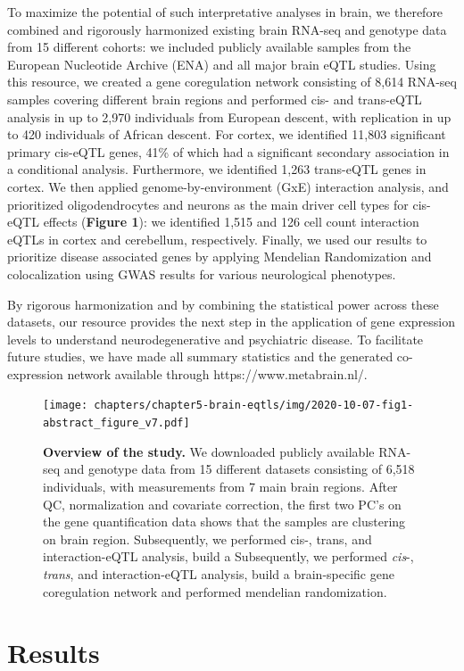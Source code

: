 {{To maximize the potential of such interpretative analyses in brain, we therefore combined and rigorously harmonized existing brain RNA-seq and genotype data from 15 different cohorts: we included publicly available samples from the European Nucleotide Archive (ENA) and all major brain eQTL studies. Using this resource, we created a gene coregulation network consisting of 8,614 RNA-seq samples covering different brain regions and performed cis- and trans-eQTL analysis in up to 2,970 individuals from European descent, with replication in up to 420 individuals of African descent. For cortex, we identified 11,803 significant primary cis-eQTL genes, 41\% of which had a significant secondary association in a conditional analysis. Furthermore, we identified 1,263 trans-eQTL genes in cortex. We then applied genome-by-environment (GxE) interaction analysis, and prioritized oligodendrocytes and neurons as the main driver cell types for cis-eQTL effects (\textbf{Figure 1}): we identified 1,515 and 126 cell count interaction eQTLs in cortex and cerebellum, respectively. Finally, we used our results to prioritize disease associated genes by applying Mendelian Randomization and colocalization using GWAS results for various neurological phenotypes.  

By rigorous harmonization and by combining the statistical power across these datasets, our resource provides the next step in the application of gene expression levels to understand neurodegenerative and psychiatric disease. To facilitate future studies, we have made all summary statistics and the generated co-expression network available through https://www.metabrain.nl/. 

\begin{figure}[h!]
	\texttt{[image: chapters/chapter5-brain-eqtls/img/2020-10-07-fig1-abstract\_figure\_v7.pdf]}
	\caption{\textbf{Overview of the study.} We downloaded publicly available RNA-seq and genotype data from 15 different datasets consisting of 6,518 individuals, with measurements from 7 main brain regions.  After QC, normalization and covariate correction, the first two PC’s on the gene quantification data shows that the samples are clustering on brain region. Subsequently, we performed cis-, trans, and interaction-eQTL analysis, build a Subsequently, we performed \emph{cis}-, \emph{trans}, and interaction-eQTL analysis, build a brain-specific gene coregulation network and performed mendelian randomization.}
\end{figure}


\section{Results}
}}

